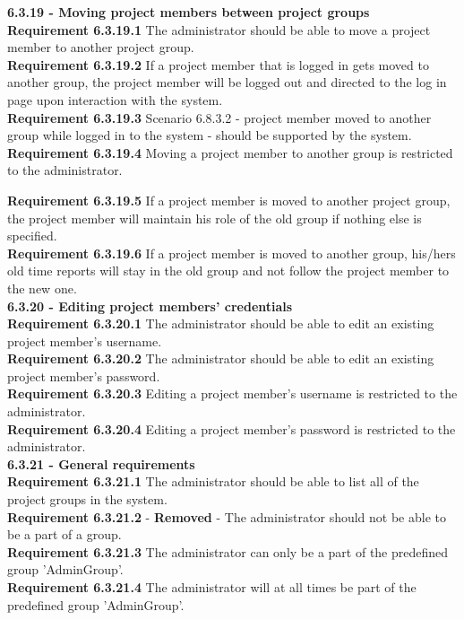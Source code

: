 \documentclass{article}
\begin{document}
{\fontsize{11}{11}\selectfont \noindent\textbf{6.3.19 - Moving project members between project groups}} \\
\noindent\textbf{Requirement 6.3.19.1} The administrator should be able to move a project member to another project group. \\
\textbf{Requirement 6.3.19.2} If a project member that is logged in gets moved to another group, the project member will be logged out and directed to the log in page upon interaction with the system.\\
\textbf{Requirement 6.3.19.3} Scenario 6.8.3.2 - project member moved to another group while logged in to the system - should be supported by the system. \\
\noindent\textbf{Requirement 6.3.19.4} Moving a project member to another group is restricted to the administrator. \\
\addtocounter{adminRef}{1}
\noindent\textbf{Requirement 6.3.19.5} If a project member is moved to another project group, the project member will maintain his role of the old group if nothing else is specified.  \\
\textbf{Requirement 6.3.19.6} If a project member is moved to another group, his/hers old time reports will stay in the old group and not follow the project member to the new one. \\

{\fontsize{11}{11}\selectfont \noindent\textbf{6.3.20 - Editing project members' credentials}} \\
\noindent\textbf{Requirement 6.3.20.1} The administrator should be able to edit an existing project member's username. \\
\noindent\textbf{Requirement 6.3.20.2} The administrator should be able to edit an existing project member's password. \\
\noindent\textbf{Requirement 6.3.20.3} Editing a project member's username is restricted to the administrator. \\
\noindent\textbf{Requirement 6.3.20.4} Editing a project member's password is restricted to the administrator. \\

{\fontsize{11}{11}\selectfont \noindent\textbf{6.3.21 - General requirements}} \\
\textbf{Requirement 6.3.21.1} The administrator should be able to list all of the project groups in the system. \\
\textbf{Requirement 6.3.21.2}  - \textbf{Removed} - The administrator should not be able to be a part of a group.\\
\textbf{Requirement 6.3.21.3} The administrator can only be a part of the predefined group 'AdminGroup'.\\
\textbf{Requirement 6.3.21.4} The administrator will at all times be part of the predefined group 'AdminGroup'.\\
\end{document}
